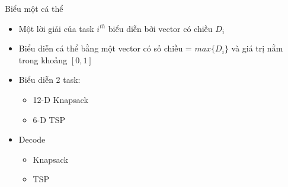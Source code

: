 \documentclass[compress]{beamer}
\begin{document}
\begin{frame}{Biểu một cá thể}
\begin{itemize}
\item Một lời giải của task $i^{th}$ biểu diễn bởi vector có chiều $D_i$
\item Biểu diễn cá thể bằng một vector có số chiều = $max\{D_i\}$ và giá trị nằm trong khoảng $[0,1]$
\item Biểu diễn 2 task: 
\begin{itemize}
\item 12-D Knapsack 
\item 6-D TSP 
\end{itemize}
\item Decode
\begin{itemize}
\item Knapsack
\item TSP
\end{itemize}
\end{itemize}
\end{frame}
\end{document}
